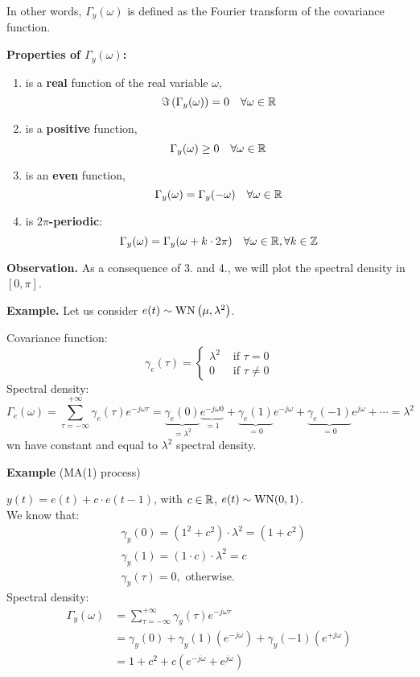 In other words, $\Gamma_y(\omega)$ is defined as the Fourier transform of the covariance function.

\textbf{Properties of $\Gamma_{y}(\omega)$:}
\begin{enumerate}
	\item is a \textbf{real} function of the real variable $\omega$,
	$$
		\Im\left(\Gamma_{y}(\omega)\right)=0 \quad \forall \omega \in \mathbb{R}
	$$
	\item is a \textbf{positive} function,
	$$
		\Gamma_{y}(\omega) \geq 0 \quad \forall \omega \in \mathbb{R}
	$$
	\item is an \textbf{even} function,
	$$
		\Gamma_{y}(\omega)=\Gamma_{y}(-\omega) \quad \forall \omega \in \mathbb{R}
	$$
	\item is \textbf{$2\pi$-periodic}:
	$$
		\Gamma_{y}(\omega)=\Gamma_{y}(\omega+k \cdot 2 \pi) \quad \forall \omega \in \mathbb{R}, \forall k \in \mathbb{Z}
	$$
\end{enumerate}

\textbf{Observation.}
As a consequence of 3. and 4., we will plot the spectral density in $[0, \pi]$.

\textbf{Example.}
Let us consider $e(t) \sim \operatorname{WN}\left(\mu, \lambda^{2}\right)$. 

Covariance function:
\[
	\gamma_{e}(\tau)= \begin{cases}\lambda^{2} & \text { if } \tau=0 \\ 0 & \text { if } \tau \neq 0\end{cases}
\]
Spectral density:
\[
	\Gamma_{e}(\omega) =\sum_{\tau=-\infty}^{+\infty} \gamma_{e}(\tau) e^{-j \omega \tau}=\underbrace{\gamma_{e}(0)}_{=\lambda^2} \underbrace{e^{-j \omega 0}}_{=1}+\underbrace{\gamma_{e}(1)}_{=0} e^{-j \omega} + \underbrace{\gamma_{e}(-1)}_{=0} e^{j \omega}+\cdots = \lambda^{2}
\]
\gls{wn} have constant and equal to $\lambda^{2}$ spectral density.

\textbf{Example} (MA(1) process)

$y(t)=e(t)+c \cdot e(t-1)$, with $c \in \mathbb{R}$, $e(t)\sim \operatorname{WN}(0,1)$.\\
We know that:
\begin{align*}
	&\gamma_{y}(0)=(1^{2}+c^{2})\cdot \lambda^{2}=(1+c^{2})\\
	&\gamma_{y}(1)=(1 \cdot c) \cdot \lambda^{2}=c \\
	&\gamma_{y}(\tau)=0, \text{ otherwise.}
\end{align*}
Spectral density:
\begin{align*}
	\Gamma_{y}(\omega)&=\sum_{\tau=-\infty}^{+\infty} \gamma_{y}(\tau) e^{-j \omega \tau}\\
	&=\gamma_{y}(0)+\gamma_{y}(1)(e^{-j \omega})+\gamma_{y}(-1)(e^{+j \omega}) \\
	&=1+c^{2}+c(e^{-j \omega}+e^{j \omega})
\end{align*}

